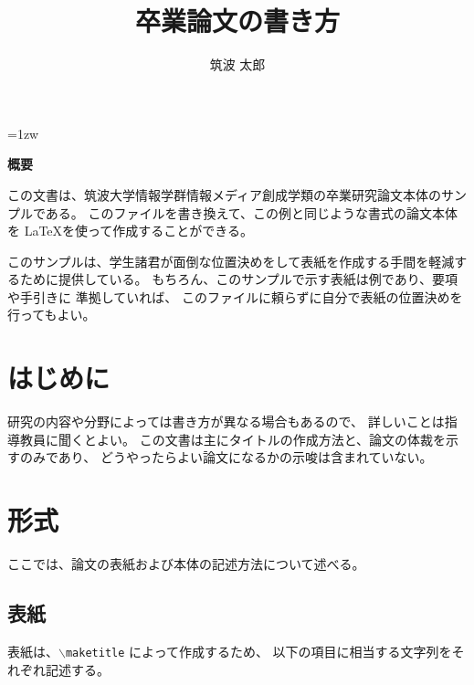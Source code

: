 \documentclass[a4paper,11pt]{jreport}
\title{卒業論文の書き方}
\author{筑波 太郎}
\begin{document}
\maketitle
\thispagestyle{empty}
\newpage

\thispagestyle{empty}
\vspace*{20pt plus 1fil}
\parindent=1zw
\noindent
\begin{center}
{\bf 概要}
\vspace{5mm}
\end{center}
この文書は、筑波大学情報学群情報メディア創成学類の卒業研究論文本体のサンプルである。
このファイルを書き換えて、この例と同じような書式の論文本体を \LaTeX を使って作成することができる。

このサンプルは、学生諸君が面倒な位置決めをして表紙を作成する手間を軽減するために提供している。
もちろん、このサンプルで示す表紙は例であり、要項や手引きに 準拠していれば、
このファイルに頼らずに自分で表紙の位置決めを行ってもよい。

\par
\vspace{0pt plus 1fil}
\newpage

\tableofcontents
\listoffigures

\pagebreak \setcounter{page}{1}


\chapter{はじめに}

研究の内容や分野によっては書き方が異なる場合もあるので、
詳しいことは指導教員に聞くとよい。
この文書は主にタイトルの作成方法と、論文の体裁を示すのみであり、
どうやったらよい論文になるかの示唆は含まれていない。

\chapter{形式}

ここでは、論文の表紙および本体の記述方法について述べる。

\section{表紙}

表紙は、{\tt $\backslash$maketitle} によって作成するため、
以下の項目に相当する文字列をそれぞれ記述する。
\end{document}
